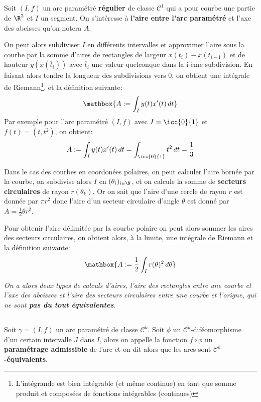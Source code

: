 \subsection*{}
Soit \((I, f)\) un arc paramétré \textbf{régulier} de classe \(\mathcal{C}^1\) qui a pour courbe une partie de \(\R^2\) et \(I\) un segment. On s'intéresse à \textbf{l'aire entre l'arc paramétré} et l'axe des abcisses qu'on notera \(A\).
\pagebreak

On peut alors subdiviser \(I\) en différents intervalles et approximer l'aire sous la courbe par la somme d'aires de rectangles de largeur \(x(t_i)-x(t_{i-1})\) et de hauteur \(y(x(\overline{t}_i))\) avec \(\overline{t}_i\) une valeur quelconque dans la i-ème subdivision. En faisant alors tendre la longueur des subdivisions vers 0, on obtient une intégrale de Riemann\footnote[1]{\label{note1}L'intégrande est bien intégrable (et même continue) en tant que somme produit et composées de fonctions intégrables (continues)}, et la définition suivante:
\[
   \mathbox{A := \int_I y(t)x'(t)\, dt}  
\]
Par exemple pour l'arc paramétré \((I, f)\) avec \(I = \icc{0}{1}\) et \(f(t) = (t, t^2)\), on obtient:
\[
   A := \int_I y(t)x'(t)\, dt = \int_{\icc{0}{1}} t^2\, dt = \frac{1}{3}
\]

Dans le cas des courbes en coordonées polaires, on peut calculer l'aire bornée par la courbe, on subdivise alors \(I\) en \((\theta_i)_{i \in \N}\), et on calcule la somme de \textbf{secteurs circulaires} de rayon \(r(\theta_k)\). Or on sait que l'aire d'une cercle de rayon \(r\) est donnée par \(\pi r^2\) donc l'aire d'un secteur circulaire d'angle \(\theta\) est donné par \(A = \frac{1}{2}\theta r^2\).\<

Pour obtenir l'aire délimitée par la courbe polaire on peut alors sommer les aires des secteurs circulaires, on obtient alors, à la limite, une intégrale de Riemann et la définition suivante:
\[
   \mathbox{A := \frac{1}{2} \int_I r(\theta)^2\, d\theta}  
\]
\begin{center}
   \textit{
      On a alors deux types de calculs d'aires, l'aire des rectangles entre une courbe et l'axe des abcisses et l'aire des secteurs circulaires entre une courbe et l'origne, qui ne sont \textbf{pas du tout équivalentes}.
   }
\end{center}

\subsection*{}
Soit \(\gamma = (I, f)\) un arc paramétré de classe \(\mathcal{C}^k\). Soit \(\phi\) un \(\mathcal{C}^k\)-diféomorphisme d'un certain intervalle \(J\) dans \(I\), alors on appelle la fonction \(f \circ \phi\) un \textbf{paramétrage admissible} de l'arc et on dit alors que les arcs sont \(\mathcal{C}^k\)\textbf{-équivalents}.\<

